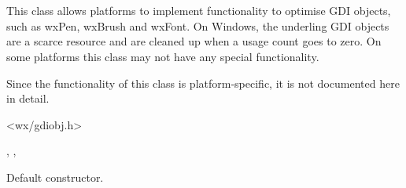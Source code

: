 \section{}\label{wxgdiobject}

This class allows platforms to implement functionality to optimise GDI objects, such
as wxPen, wxBrush and wxFont. On Windows, the underling GDI objects are a scarce resource
and are cleaned up when a usage count goes to zero. On some platforms this
class may not have any special functionality.

Since the functionality of this class is platform-specific, it is not documented here in detail.




<wx/gdiobj.h>




, , 


\label{wxgdiobjectconstr}


Default constructor.


